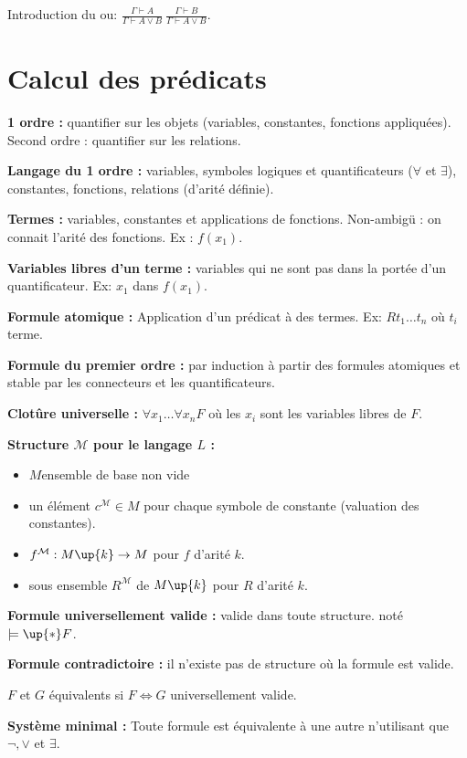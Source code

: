 \documentclass[french]{article}
\begin{document}
Introduction du ou:
$\frac{\Gamma\vdash A}{\Gamma\vdash A\vee B}\ \frac{\Gamma\vdash B}{\Gamma\vdash A\vee B}$.

\section{Calcul des prédicats}
\textbf{1 ordre :} quantifier sur les objets (variables, constantes, fonctions appliquées). Second ordre : quantifier sur les relations.

\textbf{Langage du 1 ordre :} variables, symboles logiques et quantificateurs ($\forall$ et $\exists$), constantes, fonctions, relations (d'arité définie).

\textbf{Termes :} variables, constantes et applications de fonctions. Non-ambigü : on connait l'arité des fonctions. Ex : $f (x_1)$.

\textbf{Variables libres d'un terme :} variables qui ne sont pas dans la portée d'un quantificateur. Ex: $x_1$ dans $f (x_1)$. 

\textbf{Formule atomique :} Application d'un prédicat à des termes. Ex: $R t_1\dots t_n$ où $t_i$ terme.

\textbf{Formule du premier ordre :} par induction à partir des formules atomiques et stable par les connecteurs et les quantificateurs.

\textbf{Clotûre universelle :} $\forall x_1\dots\forall x_n F$ où les $x_i$ sont les variables libres de $F$.

\textbf{Structure $\mathcal{M}$ pour le langage $L$ :}
\begin{itemize}
\item $M$ensemble de base non vide
\item un élément $c^{\mathcal{M}}\in M$ pour chaque symbole de constante (valuation des constantes).
\item $f^{\mathcal{M}}:M\up{k}\rightarrow M$ pour $f$ d'arité $k$.
\item sous ensemble $R^{\mathcal{M}}$ de $M\up{k}$ pour $R$ d'arité $k$.
\end{itemize}


\textbf{Formule universellement valide :} valide dans toute structure. noté $\models\up{*} F$.

\textbf{Formule contradictoire :} il n'existe pas de structure où la formule est valide.

$F$ et $G$ équivalents si $F\Leftrightarrow G$ universellement valide.

\textbf{Système minimal :} Toute formule est équivalente à une autre n'utilisant que $\neg, \vee$ et $\exists$.
\end{document}
